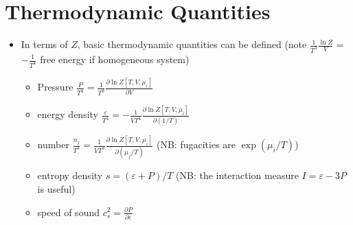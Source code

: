 \section{Thermodynamic Quantities}

\begin{itemize}
    \item In terms of $Z$, basic thermodynamic quantities can be defined (note $\frac{1}{T^3}\frac{\ln Z}{V}$ = $-\frac{1}{T^4}$ free energy if homogeneous system)
    \begin{itemize}
        \item Pressure $\frac{P}{T^4} = \frac{1}{T^3}\frac{\partial \ln Z[T,V,\mu_i]}{\partial V}$
        \item energy density $\frac{\varepsilon}{T^4} = - \frac{1}{V T^4}\frac{\partial \ln Z[T,V,\mu_i]}{\partial(1/T)}$
        \item number $\frac{n_j}{T^3} = \frac{1}{VT^3}\frac{\partial \ln Z[T,V,\mu_i]}{\partial(\mu_j/T)}$ (NB: fugacities are $\exp(\mu_i/T)$)
        \item entropy density $s = (\varepsilon + P)/T$ (NB: the interaction measure $I = \varepsilon - 3 P$ is useful)
        \item speed of sound $c_s^2 = \frac{\partial P}{\partial \varepsilon}$
    \end{itemize}
\end{itemize}

